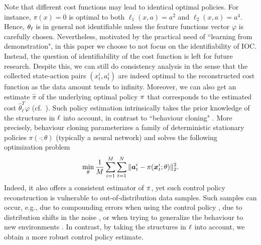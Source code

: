 Note that different cost functions may lead to identical optimal policies.
For instance, $\pi(x)=0$ is optimal to both $\ell_1(x,a)=a^2$ and $\ell_2(x,a)=a^4$.
Hence, $\relax{\theta}_\ell$ is in general not identifiable unless the feature functions vector $\varphi$ is carefully chosen.
Nevertheless, motivated by the practical need of ``learning from demonstration", in this paper we choose to not focus on the identifiability of IOC. Instead, the question of identifiability of the cost function is left for future research.
Despite this, we can still do consistency analysis in the sense that the collected state-action pairs $(x_t^i, a_t^i)$ are indeed optimal to the reconstructed cost function as the data amount tends to infinity. 
Moreover, we can also get an estimate $\hat{\pi}$ of the underlying optimal policy $\relax{\pi}$ that corresponds to the estimated cost $\hat{\theta}_\ell^T\varphi$ (cf.~\citep{zhang2024inverse}).
Such policy estimation intrinsically takes the prior knowledge of the structures in $\relax{\ell}$ into account, in contrast to ``behaviour cloning" \citep{sammut2017behavioral, codevilla2019exploring, torabi2018behavioralcloningobservation}. More precisely, behaviour cloning parameterizes a family of deterministic stationary policies $\pi(\cdot;\theta)$ (typically a neural network) and solves the following optimization problem
\begin{align}
\min_{\theta}\frac{1}{M}\sum_{i=1}^M\sum_{t=1}^N\|\bm{a}_t^i-\pi(\bm{x}_t^i;\theta)\|_2^2.
\label{eq:behaviour_cloning}
\end{align}
Indeed, it also offers a consistent estimator of $\relax{\pi}$, yet such control policy reconstruction is vulnerable to out-of-distribution data samples.
Such samples can occur, e.g., due to compounding errors when using the control policy \citep{ross2011reduction}, due to distribution shifts in the noise \citep{pmlr-v70-pinto17a}, or when trying to generalize the behaviour to new environments \citep{pmlr-v48-finn16, fu2017learning}. 
In contrast, by taking the structures in $\relax{\ell}$ into account, we obtain a more robust control policy estimate.
